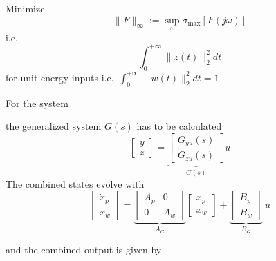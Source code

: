 \newpar{}

Minimize
\begin{equation*}
    \|F\|_\infty:=\sup_\omega\sigma_{\max}[F(j\omega)]
\end{equation*}
i.e.\
\begin{equation*}
    \int_0^{+\infty}\|z(t)\|_2^2dt
\end{equation*}
for unit-energy inputs i.e.\ $\int_0^{+\infty}\|w(t)\|_2^2 dt=1$

\begin{examplesection}
    For the system
    \begin{center}
        
    \end{center}
    the generalized system $G(s)$ has to be calculated
    \begin{equation*}
        \begin{bmatrix}
            y \\
            z
        \end{bmatrix}
        = \underbrace{\begin{bmatrix}
                G_{yu}(s) \\
                G_{zu}(s)
            \end{bmatrix}}_{G(s)} u
    \end{equation*}
    The combined states evolve with
    \begin{equation*}
        \begin{bmatrix}
            \dot{x}_p \\
            \dot{x}_w
        \end{bmatrix}
        = \underbrace{\begin{bmatrix}
                A_p & 0   \\
                0   & A_w
            \end{bmatrix}}_{A_G}
        \begin{bmatrix}
            x_p \\
            x_w
        \end{bmatrix}
        + \underbrace{\begin{bmatrix}
                B_p \\
                B_w
            \end{bmatrix}}_{B_G} \: u
    \end{equation*}

    and the combined output is given by


\end{examplesection}
